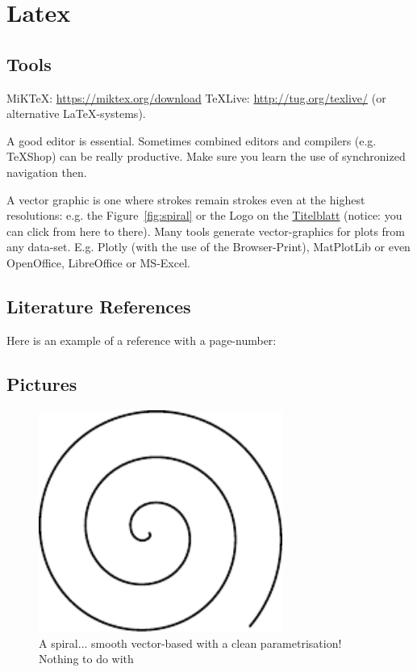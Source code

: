 

\chapter{Latex}

\section{Tools}

MiKTeX: \url{https://miktex.org/download}
TeXLive: \url{http://tug.org/texlive/}
 (or alternative LaTeX-systems).
 
 A good editor is essential. Sometimes combined editors and compilers (e.g. TeXShop) can be really productive. Make sure you learn the use of synchronized navigation then.

A vector graphic is one where strokes remain strokes even at the highest resolutions: e.g. the Figure~\eqref{fig:spiral} or the Logo on the \hyperref[titlePage]{Titelblatt} (notice: you can click from here to there).
Many tools generate vector-graphics for plots from any data-set. E.g. Plotly (with the use of the Browser-Print), MatPlotLib or even OpenOffice, LibreOffice or MS-Excel.

\section{Literature References}
Here is an example of a reference with a page-number: \cite[S. 6]{DueckKo:2016}


\section{Pictures}

\begin{figure}[h]
\centering
\includegraphics[width=8cm]{pics/spiral.pdf}
\caption{A spiral... smooth vector-based with a clean parametrisation! \\ Nothing to do with \cite{Gage:18}}\label{fig:spiral}
\end{figure}
\FloatBarrier

